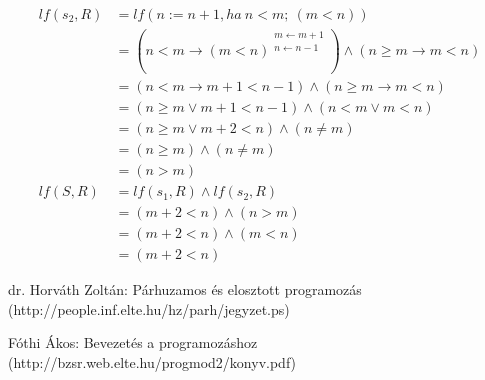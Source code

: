 \documentclass[12pt]{article}
\begin{document}
\begin{enumerate}
\begin{enumerate}[a)]
\begin{align*}
						lf(s_2, R) &= lf(n := n + 1, ha\ n < m;\ (m < n)) \\
							&= (n < m \rightarrow (m < n)^{\substack{ m \leftarrow m + 1 \\ n \leftarrow n - 1 }}) \land (n \ge m \rightarrow m < n) \\
							&= (n < m \rightarrow m + 1 < n - 1) \land (n \ge m \rightarrow m < n) \\
							&= (n \ge m \lor m + 1 < n - 1) \land (n < m \lor m < n) \\
							&= (n \ge m \lor m + 2 < n) \land (n \neq m) \\
							&= (n \ge m) \land (n \neq m) \\
							&= (n > m) \\
						lf(S, R) &= lf(s_1, R) \land lf(s_2, R) \\
						&= (m+2 < n) \land (n > m) \\
						&= (m+2 < n) \land (m < n) \\
						&= (m+2 < n)
					\end{align*}
			\end{enumerate}
	\end{enumerate}


\begin{thebibliography}{9}
\raggedright
dr. Horváth Zoltán: Párhuzamos és elosztott programozás (http://people.inf.elte.hu/hz/parh/jegyzet.ps)

Fóthi Ákos: Bevezetés a programozáshoz (http://bzsr.web.elte.hu/progmod2/konyv.pdf)

\end{thebibliography}
\end{document}
